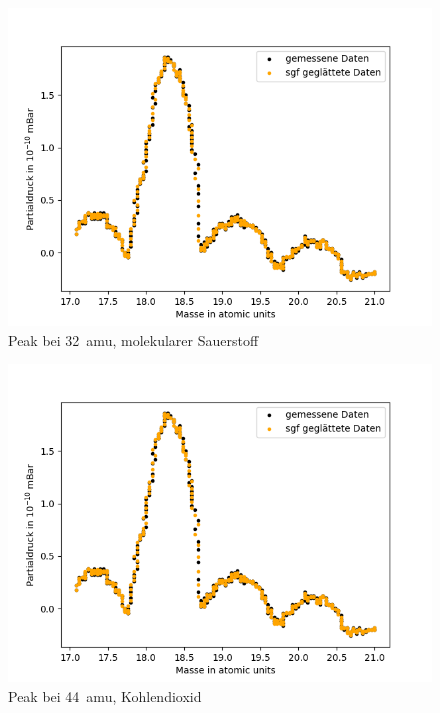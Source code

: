 \begin{figure}
    \centering
    \includegraphics[width=140mm,scale=0.8]{Massenspektrometer/include/MSm18Wasser.png}
    \caption{Peak bei \SI{32}{amu}, molekularer Sauerstoff}
    \label{fig:MSO2Peak}
\end{figure}
\begin{figure}
    \centering
    \includegraphics[width=140mm,scale=0.8]{Massenspektrometer/include/MSm18Wasser.png}
    \caption{Peak bei \SI{44}{amu}, Kohlendioxid}
    \label{fig:MSCO2Peak}
\end{figure}